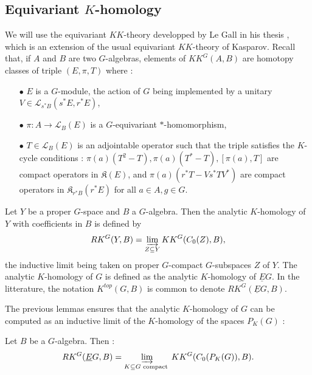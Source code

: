 \subsection{Equivariant $K$-homology}

We will use the equivariant $KK$-theory developped by Le Gall in his thesis \cite{LeGall}, which is an extension of the usual equivariant $KK$-theory of Kasparov. Recall that, if $A$ and $B$ are two $G$-algebras, elements of $KK^G(A,B)$ are homotopy classes of triple $(E,\pi,T)$ where :\\

\begin{itemize}
\item[$\bullet$] $E$ is a $G$-module, the action of $G$ being implemented by a unitary $V\in\mathcal L_{s^* B}(s^* E, r^* E)$,
\item[$\bullet$] $\pi : A\rightarrow \mathcal L_B(E)$ is a $G$-equivariant $*$-homomorphism,
\item[$\bullet$] $T\in \mathcal L_B(E)$ is an adjointable operator such that the triple satisfies the $K$-cycle conditions : $\pi(a)(T^2-T),\pi(a)(T^*-T),[\pi(a),T]$ are compact operators in $\mathfrak K(E)$, and $\pi(a)(r^*T-V s^*T V^*)$ are compact operators in $\mathfrak K_{r^* B}(r^* E)$ for all $a\in A, g\in G$.\\
\end{itemize}

\begin{definition}
Let $Y$ be a proper $G$-space and $B$ a $G$-algebra. Then the analytic $K$-homology of $Y$ with coefficients in $B$ is defined by 
\[RK^G(Y,B) = \varinjlim_{Z\subseteq Y} KK^G(C_0(Z),B), \]
the inductive limit being taken on proper $G$-compact $G$-subspaces $Z$ of $Y$. The analytic $K$-homology of $G$ is defined as the analytic $K$-homology of $\underline E G$. In the litterature, the notation $K^{top}(G,B)$ is common to denote $RK^G(\underline E G,B)$.
\end{definition}

The previous lemmas ensures that the analytic $K$-homology of $G$ can be computed as an inductive limit of the $K$-homology of the spaces $P_K(G)$ :
\begin{lem} Let $B$ be a $G$-algebra. Then :
\[RK^G(\underline E G,B) = \varinjlim_{K\subseteq G \text{ compact }} KK^G(C_0(P_K(G)),B).\]
\end{lem}

